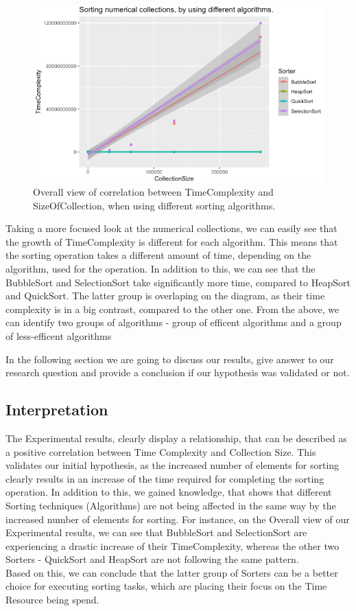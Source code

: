 \documentclass[]{report}
\begin{document}
				
		\begin{figure}[h]
			\centering
			\includegraphics[width=0.7\linewidth]{overallInts}
			\caption[Figure 3.3]{Overall view of correlation between TimeComplexity and SizeOfCollection, when using different sorting algorithms.}
		\end{figure}
		
		Taking a more focused look at the numerical collections, we can easily see that the growth of TimeComplexity is different for each algorithm. This means that the sorting operation takes a different amount of time, depending on the algorithm, used for the operation. In addition to this, we can see that the BubbleSort and SelectionSort take significantly more time, compared to HeapSort and QuickSort. The latter group is overlaping on the diagram, as their time complexity is in a big contrast, compared to the other one. From the above, we can identify two groups of algorithms - group of efficent algorithms and a group of less-efficent algorithms
		
	
In the following section we are going to discuss our results, give answer to our research question and provide a conclusion if our hypothesis was validated or not.
\subsection{Interpretation}
The Experimental results, clearly display a relationship, that can be described as a  positive correlation between Time Complexity and Collection Size. This validates our initial hypothesis, as the increased number of elements for sorting clearly results in an increase of the time required for completing the sorting operation. In addition to this, we gained knowledge, that shows that different Sorting techniques (Algorithms) are not being affected in the same way by the increased number of elements for sorting. For instance, on the Overall view of our Experimental results, we can see that BubbleSort and SelectionSort are experiencing a drastic increase of their TimeComplexity, whereas the other two Sorters - QuickSort and HeapSort are not following the same pattern.\\
Based on this, we can conclude that the latter group of Sorters can be a better choice for executing sorting tasks, which are placing their focus on the Time Resource being spend.
\end{document}

